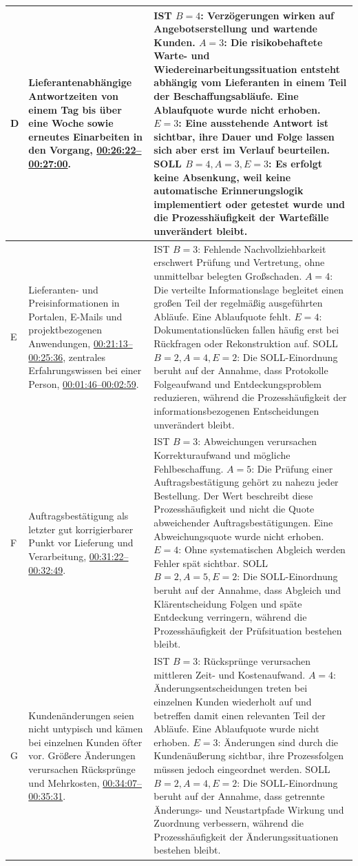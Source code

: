 \documentclass[a4paper,12pt]{article}
\begin{document}
\begin{longtable}{@{}p{}p{}p{}@{}}
    D & Lieferantenabhängige Antwortzeiten von einem Tag bis über eine Woche sowie erneutes Einarbeiten in den Vorgang, \hyperlink{itv:wartezeiten}{00:26:22--00:27:00}. & IST \(B=4\): Verzögerungen wirken auf Angebotserstellung und wartende Kunden. \(A=3\): Die risikobehaftete Warte- und Wiedereinarbeitungssituation entsteht abhängig vom Lieferanten in einem Teil der Beschaffungsabläufe. Eine Ablaufquote wurde nicht erhoben. \(E=3\): Eine ausstehende Antwort ist sichtbar, ihre Dauer und Folge lassen sich aber erst im Verlauf beurteilen. SOLL \(B=4, A=3, E=3\): Es erfolgt keine Absenkung, weil keine automatische Erinnerungslogik implementiert oder getestet wurde und die Prozesshäufigkeit der Wartefälle unverändert bleibt. \\
    \midrule
    E & Lieferanten- und Preisinformationen in Portalen, E-Mails und projektbezogenen Anwendungen, \hyperlink{itv:digitale-werkzeuge}{00:21:13--00:25:36}, zentrales Erfahrungswissen bei einer Person, \hyperlink{itv:rolle-materialbestellung}{00:01:46--00:02:59}. & IST \(B=3\): Fehlende Nachvollziehbarkeit erschwert Prüfung und Vertretung, ohne unmittelbar belegten Großschaden. \(A=4\): Die verteilte Informationslage begleitet einen großen Teil der regelmäßig ausgeführten Abläufe. Eine Ablaufquote fehlt. \(E=4\): Dokumentationslücken fallen häufig erst bei Rückfragen oder Rekonstruktion auf. SOLL \(B=2, A=4, E=2\): Die SOLL-Einordnung beruht auf der Annahme, dass Protokolle Folgeaufwand und Entdeckungsproblem reduzieren, während die Prozesshäufigkeit der informationsbezogenen Entscheidungen unverändert bleibt. \\
    \midrule
    F & Auftragsbestätigung als letzter gut korrigierbarer Punkt vor Lieferung und Verarbeitung, \hyperlink{itv:fehlerstellen}{00:31:22--00:32:49}. & IST \(B=3\): Abweichungen verursachen Korrekturaufwand und mögliche Fehlbeschaffung. \(A=5\): Die Prüfung einer Auftragsbestätigung gehört zu nahezu jeder Bestellung. Der Wert beschreibt diese Prozesshäufigkeit und nicht die Quote abweichender Auftragsbestätigungen. Eine Abweichungsquote wurde nicht erhoben. \(E=4\): Ohne systematischen Abgleich werden Fehler spät sichtbar. SOLL \(B=2, A=5, E=2\): Die SOLL-Einordnung beruht auf der Annahme, dass Abgleich und Klärentscheidung Folgen und späte Entdeckung verringern, während die Prozesshäufigkeit der Prüfsituation bestehen bleibt. \\
    \midrule
    G & Kundenänderungen seien nicht untypisch und kämen bei einzelnen Kunden öfter vor. Größere Änderungen verursachen Rücksprünge und Mehrkosten, \hyperlink{itv:kundenanderungen}{00:34:07--00:35:31}. & IST \(B=3\): Rücksprünge verursachen mittleren Zeit- und Kostenaufwand. \(A=4\): Änderungsentscheidungen treten bei einzelnen Kunden wiederholt auf und betreffen damit einen relevanten Teil der Abläufe. Eine Ablaufquote wurde nicht erhoben. \(E=3\): Änderungen sind durch die Kundenäußerung sichtbar, ihre Prozessfolgen müssen jedoch eingeordnet werden. SOLL \(B=2, A=4, E=2\): Die SOLL-Einordnung beruht auf der Annahme, dass getrennte Änderungs- und Neustartpfade Wirkung und Zuordnung verbessern, während die Prozesshäufigkeit der Änderungssituationen bestehen bleibt. \\

\end{longtable}
\end{document}
